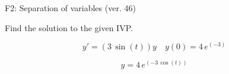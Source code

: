 \begin{exercise}
  \begin{exerciseTitle}F2: Separation of variables (ver. 46)\end{exerciseTitle}
  \begin{exerciseStatement}
    
Find the solution to the given IVP.

    
\[y'=( 3 \, \sin\left(t\right) )y\hspace{1em} y(0)= 4 \, e^{\left(-3\right)}\]

  \end{exerciseStatement}
  \begin{exerciseAnswer}
    
\[y= 4 \, e^{\left(-3 \, \cos\left(t\right)\right)}\]

  \end{exerciseAnswer}
\end{exercise}
